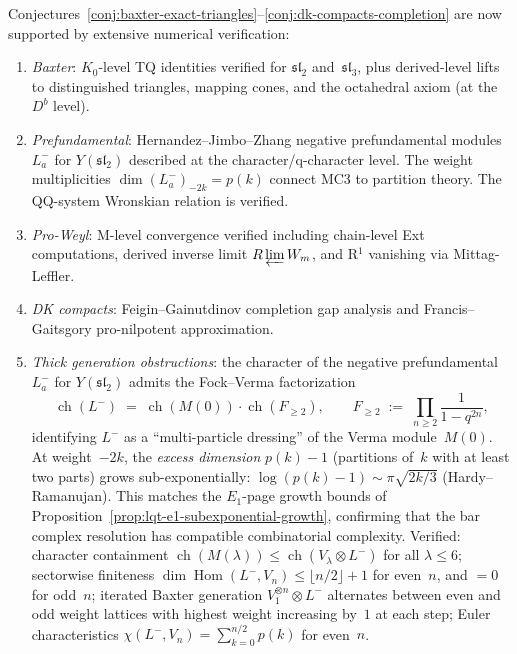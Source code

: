 \begin{remark}
\label{rem:mc3-computational-evidence}
Conjectures~\ref{conj:baxter-exact-triangles}--\ref{conj:dk-compacts-completion}
are now supported by extensive numerical verification:
\begin{enumerate}[label=\textup{(\roman*)},nosep]
\item \emph{Baxter}: $K_0$-level TQ identities verified for
  $\mathfrak{sl}_2$  and~$\mathfrak{sl}_3$, plus derived-level lifts to distinguished
  triangles, mapping cones, and the octahedral axiom
  (at the $D^b$ level).
\item \emph{Prefundamental}: Hernandez--Jimbo--Zhang negative
  prefundamental modules~$L^-_a$ for $Y(\mathfrak{sl}_2)$
  described at the character/q-character level.
  The weight multiplicities
  $\dim(L^-_a)_{-2k} = p(k)$ connect MC3 to partition theory.
  The QQ-system Wronskian relation is verified.
\item \emph{Pro-Weyl}: M-level convergence verified 
  including chain-level Ext computations, derived inverse limit
  $R\varprojlim W_m$, and R$^1$ vanishing via Mittag-Leffler.
\item \emph{DK compacts}: Feigin--Gainutdinov completion gap
  analysis and Francis--Gaitsgory pro-nilpotent approximation.
\item \emph{Thick generation obstructions}: the character
  of the negative prefundamental $L^-_a$ for $Y(\mathfrak{sl}_2)$
  admits the Fock--Verma factorization
  \[
    \operatorname{ch}(L^-)
    \;=\;
    \operatorname{ch}(M(0)) \cdot \operatorname{ch}(F_{\geq 2}),
    \qquad
    F_{\geq 2}
    \;:=\;
    \prod_{n \geq 2} \frac{1}{1 - q^{2n}},
  \]
  identifying $L^-$ as a ``multi-particle dressing'' of the Verma
  module~$M(0)$.  At weight~$-2k$, the \emph{excess dimension}
  $p(k) - 1$ (partitions of~$k$ with at least two parts) grows
  sub-exponentially:
  $\log(p(k)-1) \sim \pi\sqrt{2k/3}$ (Hardy--Ramanujan).
  This matches the $E_1$-page growth bounds of
  Proposition~\ref{prop:lqt-e1-subexponential-growth}, confirming
  that the bar complex resolution has compatible combinatorial
  complexity.  Verified:
  character containment
  $\operatorname{ch}(M(\lambda))
   \leq \operatorname{ch}(V_\lambda \otimes L^-)$
  for all $\lambda \leq 6$;
  sectorwise finiteness
  $\dim\operatorname{Hom}(L^-, V_n) \leq \lfloor n/2 \rfloor + 1$
  for even~$n$, and $= 0$ for odd~$n$;
  iterated Baxter generation $V_1^{\otimes n} \otimes L^-$
  alternates between even and odd weight lattices with
  highest weight increasing by~$1$ at each step;
  Euler characteristics
  $\chi(L^-, V_n) = \sum_{k=0}^{n/2} p(k)$ for even~$n$.
\end{enumerate}
\end{remark}

